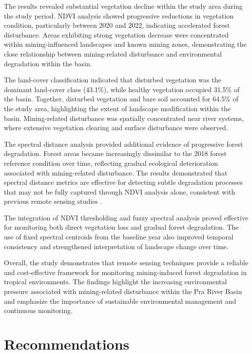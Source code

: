 \documentclass[a4paper,12pt]{report}
\begin{document}
The results revealed substantial vegetation decline within the study area during the study period. NDVI analysis showed progressive reductions in vegetation condition, particularly between 2020 and 2022, indicating accelerated forest disturbance. Areas exhibiting strong vegetation decrease were concentrated within mining-influenced landscapes and known mining zones, demonstrating the close relationship between mining-related disturbance and environmental degradation within the basin.

The land-cover classification indicated that disturbed vegetation was the dominant land-cover class (43.1\%), while healthy vegetation occupied 31.5\% of the basin. Together, disturbed vegetation and bare soil accounted for 64.5\% of the study area, highlighting the extent of landscape modification within the basin. Mining-related disturbance was spatially concentrated near river systems, where extensive vegetation clearing and surface disturbance were observed.

The spectral distance analysis provided additional evidence of progressive forest degradation. Forest areas became increasingly dissimilar to the 2018 forest reference condition over time, reflecting gradual ecological deterioration associated with mining-related disturbance. The results demonstrated that spectral distance metrics are effective for detecting subtle degradation processes that may not be fully captured through NDVI analysis alone, consistent with previous remote sensing studies \citep{richards2013remote,tarazona2020monitoring}.

The integration of NDVI thresholding and fuzzy spectral analysis proved effective for monitoring both direct vegetation loss and gradual forest degradation. The use of fixed spectral centroids from the baseline year also improved temporal consistency and strengthened interpretation of landscape change over time.

Overall, the study demonstrates that remote sensing techniques provide a reliable and cost-effective framework for monitoring mining-induced forest degradation in tropical environments. The findings highlight the increasing environmental pressure associated with mining-related disturbance within the Pra River Basin and emphasize the importance of sustainable environmental management and continuous monitoring.

\section{Recommendations}
\end{document}
